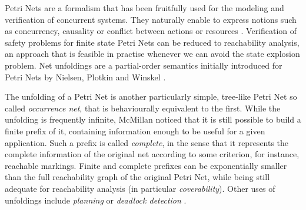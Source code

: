 \documentclass[11pt,a4paper]{article}
\begin{document}

Petri Nets are a formalism that has been fruitfully used for the modeling and
verification of concurrent systems.  They naturally enable to express notions
such as concurrency, causality or conflict between actions or resources
.  Verification of safety problems for finite state Petri Nets can
be reduced to reachability analysis, an approach that is feasible in practise
whenever we can avoid the state explosion problem.  Net unfoldings are a
partial-order semantics initially introduced for Petri Nets by Nielsen, Plotkin
and Winskel .

The unfolding of a Petri Net is another particularly simple, tree-like Petri
Net so called \emph{occurrence net}, that is behaviourally equivalent to the
first.  While the unfolding is frequently infinite, McMillan noticed
 that it is still possible to build a finite prefix of it,
containing information enough to be useful for a given application.  Such a
prefix is called \emph{complete}, in the sense that it represents the complete
information of the original net according to some criterion, for instance,
reachable markings.  Finite and complete prefixes can be exponentially smaller
than the full reachability graph of the original Petri Net, while being still
adequate for reachability analysis (in particular \emph{coverability}).  Other
uses of unfoldings include \emph{planning}  or \emph{deadlock
detection} .
\end{document}
